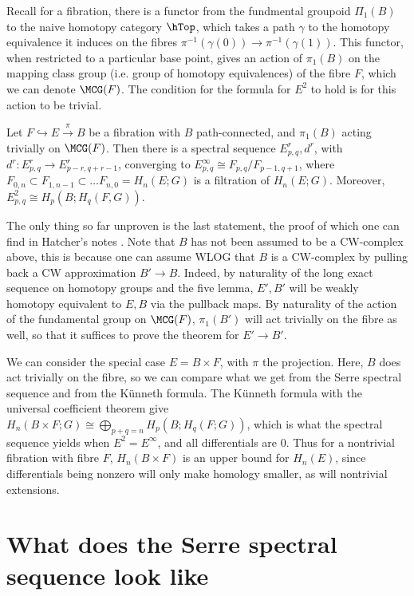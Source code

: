 \documentclass[12pt,oneside]{amsart}
\begin{document}
Recall for a fibration, there is a functor from the fundmental groupoid $\Pi_1(B)$ to the naive homotopy category $\hTop$, which takes a path $\gamma$ to the homotopy equivalence it induces on the fibres $\pi^{-1}(\gamma(0)) \to \pi^{-1}(\gamma(1))$. This functor, when restricted to a particular base point, gives an action of $\pi_1(B)$ on the mapping class group (i.e. group of homotopy equivalences) of the fibre $F$, which we can denote $\MCG(F)$. The condition for the formula for $E^2$ to hold is for this action to be trivial.

\begin{theorem}\label{serrespecseq}
Let $F \hookrightarrow E \xrightarrow{\pi} B$ be a fibration with $B$ path-connected, and $\pi_1(B)$ acting trivially on $\MCG(F)$. Then there is a spectral sequence $E^r_{p,q},d^r$, with $d^r:E^r_{p,q} \to E^r_{p-r,q+r-1}$, converging to $E^\infty_{p,q} \cong F_{p,q}/F_{p-1,q+1}$, where $F_{0,n} \subset F_{1,n-1} \subset \dots F_{n,0} = H_n(E;G)$ is a filtration of $H_n(E;G)$. Moreover, $E^2_{p,q} \cong H_p(B;H_q(F,G))$.
\end{theorem}

The only thing so far unproven is the last statement, the proof of which one can find in Hatcher's notes \cite{hatcherssat}.
Note that $B$ has not been assumed to be a CW-complex above, this is because one can assume WLOG that $B$ is a CW-complex by pulling back a CW approximation $B' \to B$. Indeed, by naturality of the long exact sequence on homotopy groups and the five lemma, $E',B'$ will be weakly homotopy equivalent to $E, B$ via the pullback maps. By naturality of the action of the fundamental group on $\MCG(F)$, $\pi_1(B')$ will act trivially on the fibre as well, so that it suffices to prove the theorem for $E' \to B'$.

We can consider the special case $E = B \times F$, with $\pi$ the projection. Here, $B$ does act trivially on the fibre, so we can compare what we get from the Serre spectral sequence and from the K\"unneth formula. The K\"unneth formula with the universal coefficient theorem give $H_n(B \times F;G) \cong \bigoplus_{p+q = n} H_p(B;H_q(F;G))$, which is what the spectral sequence yields when $E^2 = E^\infty$, and all differentials are $0$. Thus for a nontrivial fibration with fibre $F$, $H_n(B\times F)$ is an upper bound for $H_n(E)$, since differentials being nonzero will only make homology smaller, as will nontrivial extensions.

\section{What does the Serre spectral sequence look like}
\end{document}
